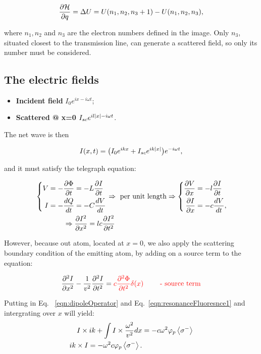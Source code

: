   \[
  	 \frac{\partial\mathcal{H}}{\partial q} = \Delta U = U(n_1, n_2, n_3+1) - U(n_1, n_2, n_3),
  \]
  
  \noindent where $ n_1, n_2 $ and $ n_3 $ are the electron numbers defined in the image. Only $ n_3 $, situated closest to the transmission line, can generate a scattered field, so only its number must be considered.
  

\subsection{The electric fields}
\begin{itemize}
	\item \textbf{Incident field} \hfill $ I_0e^{ix-i\omega t} $;
	\item \textbf{Scattered @ x=0} \hfill $ I_{sc}e^{il\left|x\right|-i\omega t} $.
\end{itemize}

\noindent The net wave is then

\begin{equation}\label{eqn:resonanceFluoresnce1}
I(x,t) = \big(I_0e^{ikx} + I_{sc}e^{ik\left|x\right|}\big)e^{-i\omega t},
\end{equation}


\noindent and it must satisfy the telegraph equation:

\[
\begin{aligned}
&\left\lbrace \begin{aligned}
V & = - \frac{\partial\Phi}{\partial t} = -L \frac{\partial I}{\partial t}\\
I & = -\frac{dQ}{dt} = -C\frac{dV}{dt}
\end{aligned}\right.\Rightarrow \text{ per unit length} \Rightarrow \left\lbrace \begin{aligned}
 \frac{\partial V}{\partial x} & = - l \frac{\partial I}{\partial t}\\
 \frac{\partial I}{\partial x} & = - c\frac{dV}{dt},
\end{aligned}\right.\\
& \qquad\qquad \Rightarrow  \frac{\partial I^2}{\partial x^2} = lc \frac{\partial I^2}{\partial t^2}
\end{aligned}
\label{tlineDiff}
\]

However, because out atom, located at $ x = 0 $, we also apply the scattering boundary condition of the emitting atom, by adding on a source term to the equation:

\[
 \frac{\partial^2I}{\partial x^2} - \frac{1}{v^2} \frac{\partial^2I}{\partial t^2} = {\color{red}{c \ensuremath{ \frac{\partial^2\Phi}{\partial t^2}}\delta(x) \qquad \text{ - source term}}}
\]

Putting in Eq. ~\eqref{eqn:dipoleOperator} and Eq.~\eqref{eqn:resonanceFluoresnce1} and intergrating over $ x $ will yield:
\begin{equation}\label{key}
\begin{aligned}
	I \times ik + \int I\times \frac{\omega^2}{v^2}dx &= -c\omega^2\varphi_p\left\langle \sigma^{-} \right\rangle\\
	ik\times I = -\omega^2 c \varphi_p\left\langle \sigma^{-} \right\rangle.
\end{aligned}
\end{equation}





\newpage

